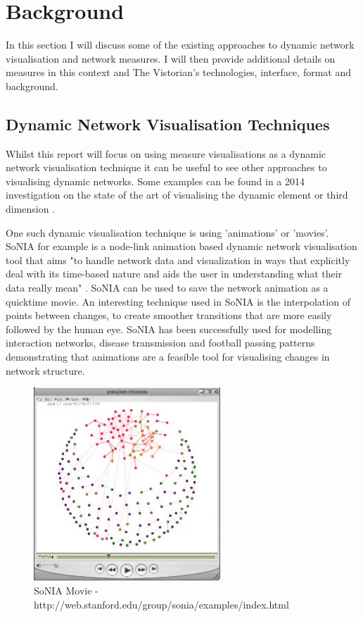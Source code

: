 
\chapter{Background}

In this section I will discuss some of the existing approaches to dynamic network visualisation and network measures. I will then provide additional details on measures in this context and The Vistorian's technologies, interface, format and background.

\section{Dynamic Network Visualisation Techniques}

Whilst this report will focus on using measure visualisations as a dynamic network visualisation technique it can be useful to see other approaches to visualising dynamic networks. Some examples can be found in a 2014 investigation on the state of the art of visualising the dynamic element or third dimension \cite{tsotaivg}.

One such dynamic visualisation technique is using 'animations' or 'movies'. SoNIA \cite{sonia} for example is a node-link animation based dynamic network visualisation tool that aims "to handle network data and visualization in ways that explicitly deal with its time-based nature and aids the user in understanding what their data really mean" \cite{taasodnv}. SoNIA can be used to save the network animation as a quicktime movie. An interesting technique used in SoNIA is the interpolation of points between changes, to create smoother transitions that are more easily followed by the human eye. SoNIA has been successfully used for modelling interaction networks, disease transmission and football passing patterns demonstrating that animations are a feasible tool for visualising changes in network structure.

\begin{figure}
\begin{center}
\includegraphics[trim={0 0 0 0}, width=70mm]{./Figures/soniaPic.jpg}
\caption{SoNIA Movie - http://web.stanford.edu/group/sonia/examples/index.html}
\end{center}
\end{figure}

